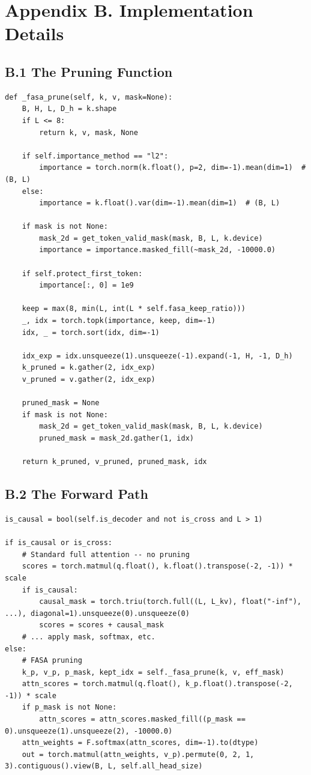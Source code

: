\section{Appendix B. Implementation Details}

\subsection{B.1 The Pruning Function}

\begin{lstlisting}
def _fasa_prune(self, k, v, mask=None):
    B, H, L, D_h = k.shape
    if L <= 8:
        return k, v, mask, None
    
    if self.importance_method == "l2":
        importance = torch.norm(k.float(), p=2, dim=-1).mean(dim=1)  # (B, L)
    else:
        importance = k.float().var(dim=-1).mean(dim=1)  # (B, L)
    
    if mask is not None:
        mask_2d = get_token_valid_mask(mask, B, L, k.device)
        importance = importance.masked_fill(~mask_2d, -10000.0)
    
    if self.protect_first_token:
        importance[:, 0] = 1e9
    
    keep = max(8, min(L, int(L * self.fasa_keep_ratio)))
    _, idx = torch.topk(importance, keep, dim=-1)
    idx, _ = torch.sort(idx, dim=-1)
    
    idx_exp = idx.unsqueeze(1).unsqueeze(-1).expand(-1, H, -1, D_h)
    k_pruned = k.gather(2, idx_exp)
    v_pruned = v.gather(2, idx_exp)
    
    pruned_mask = None
    if mask is not None:
        mask_2d = get_token_valid_mask(mask, B, L, k.device)
        pruned_mask = mask_2d.gather(1, idx)
    
    return k_pruned, v_pruned, pruned_mask, idx
\end{lstlisting}

\subsection{B.2 The Forward Path}

\begin{lstlisting}
is_causal = bool(self.is_decoder and not is_cross and L > 1)

if is_causal or is_cross:
    # Standard full attention -- no pruning
    scores = torch.matmul(q.float(), k.float().transpose(-2, -1)) * scale
    if is_causal:
        causal_mask = torch.triu(torch.full((L, L_kv), float("-inf"), ...), diagonal=1).unsqueeze(0).unsqueeze(0)
        scores = scores + causal_mask
    # ... apply mask, softmax, etc.
else:
    # FASA pruning
    k_p, v_p, p_mask, kept_idx = self._fasa_prune(k, v, eff_mask)
    attn_scores = torch.matmul(q.float(), k_p.float().transpose(-2, -1)) * scale
    if p_mask is not None:
        attn_scores = attn_scores.masked_fill((p_mask == 0).unsqueeze(1).unsqueeze(2), -10000.0)
    attn_weights = F.softmax(attn_scores, dim=-1).to(dtype)
    out = torch.matmul(attn_weights, v_p).permute(0, 2, 1, 3).contiguous().view(B, L, self.all_head_size)
\end{lstlisting}

